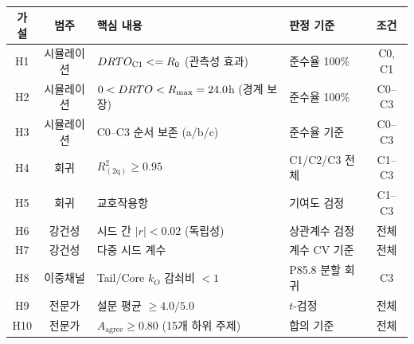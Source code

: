 \begin{table}[htbp]
\centering
\caption{}
\label{tab:hypotheses-summary}
\small
\begin{tabularx}{\textwidth}{c c X l c}
\toprule
\textbf{가설} & \textbf{범주} & \textbf{핵심 내용} & \textbf{판정 기준} & \textbf{조건} \\
\midrule
H1 & 시뮬레이션 & $DRTO_{\text{C1}} <= R_0$ (관측성 효과) & 준수율 100\% & C0, C1 \\
H2 & 시뮬레이션 & $0 < DRTO < R_{\max} = 24.0$h (경계 보장) & 준수율 100\% & C0--C3 \\
H3 & 시뮬레이션 & C0--C3 순서 보존 (a/b/c) & 준수율 기준 & C0--C3 \\
\midrule
H4 & 회귀 & $R^2_{(2\mathrm{q})} \geq 0.95$ & C1/C2/C3 전체 & C1--C3 \\
H5 & 회귀 & 교호작용항 \m{유의성($\Delta R^2$)} & 기여도 검정 & C1--C3 \\
\midrule
H6 & 강건성 & 시드 간 $|r| < 0.02$ (독립성) & 상관계수 검정 & 전체 \\
H7 & 강건성 & 다중 시드 계수 \m{안정성($10^8$회)} & 계수 CV 기준 & 전체 \\
\midrule
H8 & 이중채널 & Tail/Core $k_O$ 감쇠비 $< 1$ & P85.8 분할 회귀 & C3 \\
\midrule
H9 & 전문가 & 설문 평균 $\geq 4.0/5.0$ & $t$-검정 & 전체 \\
H10 & 전문가 & $A_{\text{agree}} \geq 0.80$ (15개 하위 주제) & 합의 기준 & 전체 \\
\bottomrule
\end{tabularx}
\end{table}
